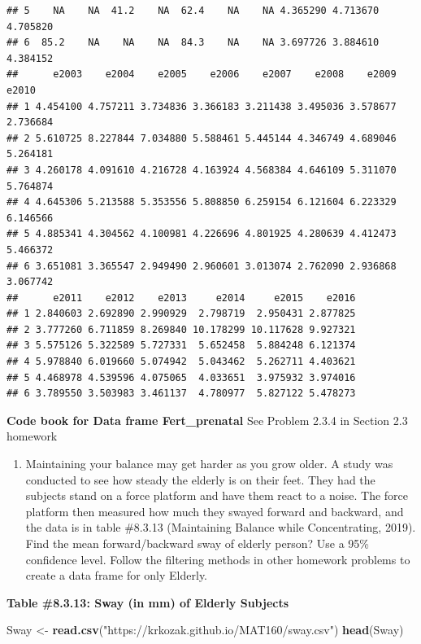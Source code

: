 \documentclass[]{book}
\newenvironment{Shaded}{\begin{snugshade}}{\end{snugshade}}
\newcommand{\KeywordTok}[1]{\textcolor[rgb]{0.13,0.29,0.53}{\textbf{#1}}}
\newcommand{\NormalTok}[1]{#1}
\newcommand{\StringTok}[1]{\textcolor[rgb]{0.31,0.60,0.02}{#1}}
\providecommand{\tightlist}{%
  \setlength{\itemsep}{0pt}\setlength{\parskip}{0pt}}
\begin{document}
\begin{verbatim}
## 5    NA    NA  41.2    NA  62.4    NA    NA 4.365290 4.713670 4.705820
## 6  85.2    NA    NA    NA  84.3    NA    NA 3.697726 3.884610 4.384152
##      e2003    e2004    e2005    e2006    e2007    e2008    e2009    e2010
## 1 4.454100 4.757211 3.734836 3.366183 3.211438 3.495036 3.578677 2.736684
## 2 5.610725 8.227844 7.034880 5.588461 5.445144 4.346749 4.689046 5.264181
## 3 4.260178 4.091610 4.216728 4.163924 4.568384 4.646109 5.311070 5.764874
## 4 4.645306 5.213588 5.353556 5.808850 6.259154 6.121604 6.223329 6.146566
## 5 4.885341 4.304562 4.100981 4.226696 4.801925 4.280639 4.412473 5.466372
## 6 3.651081 3.365547 2.949490 2.960601 3.013074 2.762090 2.936868 3.067742
##      e2011    e2012    e2013     e2014     e2015    e2016
## 1 2.840603 2.692890 2.990929  2.798719  2.950431 2.877825
## 2 3.777260 6.711859 8.269840 10.178299 10.117628 9.927321
## 3 5.575126 5.322589 5.727331  5.652458  5.884248 6.121374
## 4 5.978840 6.019660 5.074942  5.043462  5.262711 4.403621
## 5 4.468978 4.539596 4.075065  4.033651  3.975932 3.974016
## 6 3.789550 3.503983 3.461137  4.780977  5.827122 5.478273
\end{verbatim}

\textbf{Code book for Data frame Fert\_prenatal} See Problem 2.3.4 in Section 2.3 homework

\begin{enumerate}
\def\labelenumi{\arabic{enumi}.}
\setcounter{enumi}{6}
\tightlist
\item
  Maintaining your balance may get harder as you grow older. A study was conducted to see how steady the elderly is on their feet. They had the subjects stand on a force platform and have them react to a noise. The force platform then measured how much they swayed forward and backward, and the data is in table \#8.3.13 (Maintaining Balance while Concentrating, 2019). Find the mean forward/backward sway of elderly person? Use a 95\% confidence level. Follow the filtering methods in other homework problems to create a data frame for only Elderly.
\end{enumerate}

\textbf{Table \#8.3.13: Sway (in mm) of Elderly Subjects}

\begin{Shaded}
\begin{Highlighting}[]
\NormalTok{Sway <-}\StringTok{ }\KeywordTok{read.csv}\NormalTok{(}\StringTok{"https://krkozak.github.io/MAT160/sway.csv"}\NormalTok{)}
\KeywordTok{head}\NormalTok{(Sway)}
\end{Highlighting}
\end{Shaded}
\end{document}
